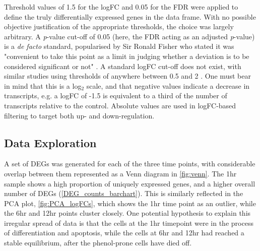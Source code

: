 Threshold values of 1.5 for the \ac{logFC} and 0.05 for the \ac{FDR} were applied to define the truly differentially expressed genes in the data frame. With no possible objective justification of the appropriate thresholds, the choice was largely arbitrary. A \textit{p}-value cut-off of 0.05 (here, the \ac{FDR} acting as an adjusted \textit{p}-value) is a \textit{de facto} standard, popularised by Sir Ronald Fisher who stated it was "convenient to take this point as a limit in judging whether a deviation is to be considered significant or not" \citep{fisher1925statistical}. A standard \ac{logFC} cut-off does not exist, with similar studies using thresholds of anywhere between 0.5 and 2 \citep{zhao2018many, cardoso2019gene, handschuh2018gene}. One must bear in mind that this is a log$_2$ scale, and that negative values indicate a decrease in transcripts, e.g. a \ac{logFC} of -1.5 is equivalent to a third of the number of transcripts relative to the control. Absolute values are used in \ac{logFC}-based filtering to target both up- and down-regulation.




\subsection{Data Exploration}

A set of \ac{DEG}s was generated for each of the three time points, with considerable overlap between them represented as a Venn diagram in \autoref{fig:venn}. The 1hr sample shows a high proportion of uniquely expressed genes, and a higher overall number of \ac{DEG}s (\autoref{DEG_counts_barchart}). This is similarly reflected in the PCA plot, \autoref{fig:PCA_logFCs}, which shows the 1hr time point as an outlier, while the 6hr and 12hr points cluster closely. One potential hypothesis to explain this irregular spread of data is that the cells at the 1hr timepoint were in the process of differentiation and apoptosis, while the cells at 6hr and 12hr had reached a stable equilibrium, after the phenol-prone cells have died off.


